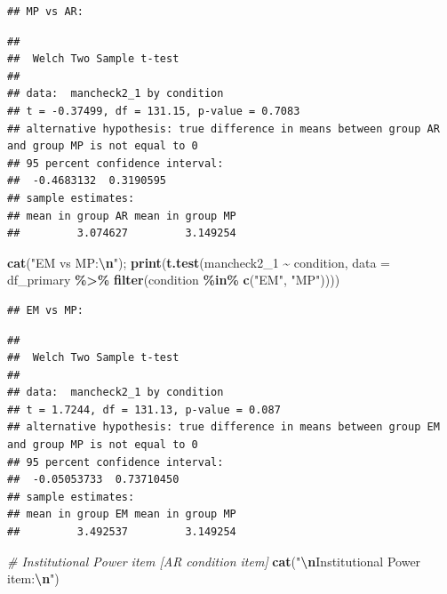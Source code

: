 \documentclass[
]{article}
\newenvironment{Shaded}{\begin{snugshade}}{\end{snugshade}}
\newcommand{\AttributeTok}[1]{\textcolor[rgb]{0.13,0.29,0.53}{#1}}
\newcommand{\CommentTok}[1]{\textcolor[rgb]{0.56,0.35,0.01}{\textit{#1}}}
\newcommand{\FunctionTok}[1]{\textcolor[rgb]{0.13,0.29,0.53}{\textbf{#1}}}
\newcommand{\NormalTok}[1]{#1}
\newcommand{\SpecialCharTok}[1]{\textcolor[rgb]{0.81,0.36,0.00}{\textbf{#1}}}
\newcommand{\StringTok}[1]{\textcolor[rgb]{0.31,0.60,0.02}{#1}}
\begin{document}
\begin{verbatim}
## MP vs AR:
\end{verbatim}

\begin{verbatim}
## 
##  Welch Two Sample t-test
## 
## data:  mancheck2_1 by condition
## t = -0.37499, df = 131.15, p-value = 0.7083
## alternative hypothesis: true difference in means between group AR and group MP is not equal to 0
## 95 percent confidence interval:
##  -0.4683132  0.3190595
## sample estimates:
## mean in group AR mean in group MP 
##         3.074627         3.149254
\end{verbatim}

\begin{Shaded}
\begin{Highlighting}[]
\FunctionTok{cat}\NormalTok{(}\StringTok{"EM vs MP:}\SpecialCharTok{\textbackslash{}n}\StringTok{"}\NormalTok{); }\FunctionTok{print}\NormalTok{(}\FunctionTok{t.test}\NormalTok{(mancheck2\_1 }\SpecialCharTok{\textasciitilde{}}\NormalTok{ condition, }
       \AttributeTok{data =}\NormalTok{ df\_primary }\SpecialCharTok{\%\textgreater{}\%} \FunctionTok{filter}\NormalTok{(condition }\SpecialCharTok{\%in\%} \FunctionTok{c}\NormalTok{(}\StringTok{"EM"}\NormalTok{, }\StringTok{"MP"}\NormalTok{))))}
\end{Highlighting}
\end{Shaded}

\begin{verbatim}
## EM vs MP:
\end{verbatim}

\begin{verbatim}
## 
##  Welch Two Sample t-test
## 
## data:  mancheck2_1 by condition
## t = 1.7244, df = 131.13, p-value = 0.087
## alternative hypothesis: true difference in means between group EM and group MP is not equal to 0
## 95 percent confidence interval:
##  -0.05053733  0.73710450
## sample estimates:
## mean in group EM mean in group MP 
##         3.492537         3.149254
\end{verbatim}

\begin{Shaded}
\begin{Highlighting}[]
\CommentTok{\# Institutional Power item [AR condition item]}
\FunctionTok{cat}\NormalTok{(}\StringTok{"}\SpecialCharTok{\textbackslash{}n}\StringTok{Institutional Power item:}\SpecialCharTok{\textbackslash{}n}\StringTok{"}\NormalTok{)}
\end{Highlighting}
\end{Shaded}
\end{document}
